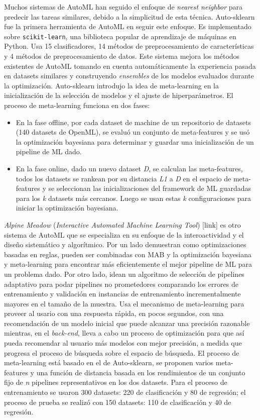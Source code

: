 Muchos sistemas de AutoML han seguido el enfoque de \textit{nearest neighbor} para predecir las tareas similares, debido a la simplicitud de esta técnica. Auto-sklearn fue la primera herramienta de AutoML en seguir este enfoque. Es implementado sobre \texttt{scikit-learn}, una biblioteca popular de aprendizaje de máquinas en Python. Usa 15 clasificadores, 14 métodos de preprocesamiento de características  y 4 métodos de preprocesamiento de datos. Este sistema mejora los métodos existentes de AutoML tomando en cuenta automáticamente la experiencia pasada en datasets similares y construyendo \textit{ensembles} de los modelos evaluados durante la optimización. Auto-sklearn introdujo la idea de meta-learning en la inicialización de la selección de modelos y el ajuste de hiperparámetros.  El proceso de meta-learning funciona en dos fases:

\begin{itemize}
	\item En la fase offline, por cada dataset de machine de un repositorio de datasets (140 datasets de OpenML), se evaluó un conjunto de meta-features  y se usó la optimización bayesiana para determinar y guardar una inicialización de un pipeline de ML dado.
	\item En la fase online, dado un nuevo dataset \textit{D}, se calculan las meta-features, todos los datasets se rankean por su distancia \textit{L1} a \textit{D} en el espacio de meta-features y se seleccionan las inicializaciones del framework de ML guardadas para los \textit{k} datasets más cercanos. Luego se usan estas \textit{k} configuraciones para iniciar la optimización bayesiana.
\end{itemize}

\textit{Alpine Meadow} (\textit{Interactive Automated Machine Learning Tool}) [link] es otro sistema de AutoML que se especializa en su enfoque de la interoactividad y el diseño sistemático y algorítmico. Por un lado demuestran como optimizaciones basadas en reglas, pueden ser combinadas con MAB y la optimización bayesiana y meta-learning para encontrar más eficientemente el mejor pipeline de ML para un problema dado. Por otro lado, idean un algoritmo de selección de pipelines adaptativo para podar pipelines no prometedores comparando los errores de entrenamiento y validación en instancias de entrenamiento incrementalmente mayores en el tamaño de la muestra. Usa el mecanismo de meta-learning para proveer al usario con una respuesta rápida, en pocos segundos, con una recomendación de un modelo inicial que puede alcanzar una precisión razonable mientras, en el \textit{back-end}, lleva a cabo un proceso de optimización para que así pueda recomendar al usuario más modelos con mejor precisión, a medida que progresa el proceso de búsqueda sobre el espacio de búsqueda. El proceso de meta-learning está basado en el de Auto-sklearn, se proponen varios meta-features y una función de distancia basada en los rendimientos de un conjunto fijo de \textit{n} pipelines representativos en los dos datasets. Para el proceso de entrenamiento se usaron 300 datasets: 220 de clasificación y 80 de regresión; el proceso de prueba se realizó con 150 datasets: 110 de clasificación y 40 de regresión.

